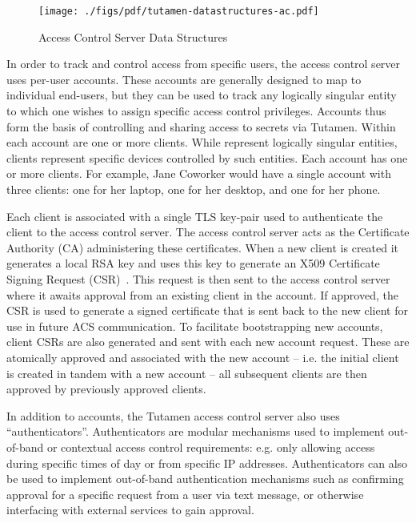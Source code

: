 \begin{figure}[th]
  \centering
  \texttt{[image: ./figs/pdf/tutamen-datastructures-ac.pdf]}
  \caption{Access Control Server Data Structures}
  \label{fig:tutamen:acstructs}
\end{figure}

In order to track and control access from specific users, the access
control server uses per-user accounts. These accounts are generally
designed to map to individual end-users, but they can be used to track
any logically singular entity to which one wishes to assign specific
access control privileges. Accounts thus form the basis of controlling
and sharing access to secrets via Tutamen. Within each account are one
or more clients. While represent logically singular entities, clients
represent specific devices controlled by such entities. Each account
has one or more clients. For example, Jane Coworker would have a
single account with three clients: one for her laptop, one for her
desktop, and one for her phone.

Each client is associated with a single TLS key-pair used to
authenticate the client to the access control server. The access
control server acts as the Certificate Authority (CA) administering
these certificates. When a new client is created it generates a local
RSA key and uses this key to generate an X509 Certificate Signing
Request (CSR)~\cite{rfc5280}. This request is then sent to the access
control server where it awaits approval from an existing client in the
account. If approved, the CSR is used to generate a signed certificate
that is sent back to the new client for use in future ACS
communication. To facilitate bootstrapping new accounts, client CSRs
are also generated and sent with each new account request. These are
atomically approved and associated with the new account -- i.e. the
initial client is created in tandem with a new account -- all
subsequent clients are then approved by previously approved clients.

In addition to accounts, the Tutamen access control server also uses
``authenticators''. Authenticators are modular mechanisms used to
implement out-of-band or contextual access control requirements:
e.g. only allowing access during specific times of day or from
specific IP addresses. Authenticators can also be used to implement
out-of-band authentication mechanisms such as confirming approval for
a specific request from a user via text message, or otherwise
interfacing with external services to gain approval.

